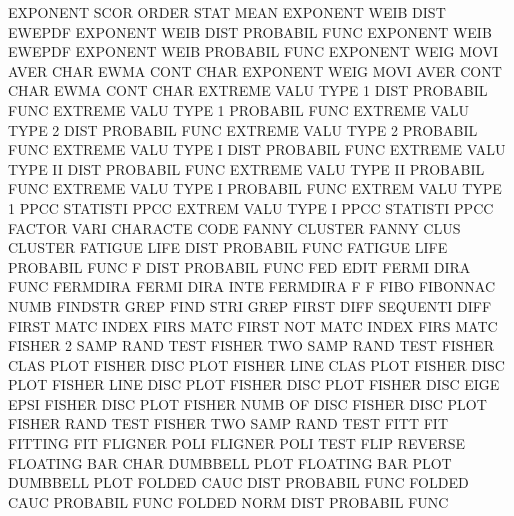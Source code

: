 EXPONENT SCOR                           ORDER    STAT MEAN
EXPONENT WEIB DIST                      EWEPDF
EXPONENT WEIB DIST                      PROBABIL FUNC
EXPONENT WEIB                           EWEPDF
EXPONENT WEIB                           PROBABIL FUNC
EXPONENT WEIG MOVI AVER CHAR            EWMA     CONT CHAR
EXPONENT WEIG MOVI AVER CONT CHAR       EWMA     CONT CHAR
EXTREME  VALU TYPE 1    DIST            PROBABIL FUNC
EXTREME  VALU TYPE 1                    PROBABIL FUNC
EXTREME  VALU TYPE 2    DIST            PROBABIL FUNC
EXTREME  VALU TYPE 2                    PROBABIL FUNC
EXTREME  VALU TYPE I    DIST            PROBABIL FUNC
EXTREME  VALU TYPE II   DIST            PROBABIL FUNC
EXTREME  VALU TYPE II                   PROBABIL FUNC
EXTREME  VALU TYPE I                    PROBABIL FUNC
EXTREM   VALU TYPE 1    PPCC            STATISTI PPCC
EXTREM   VALU TYPE I    PPCC            STATISTI PPCC
FACTOR   VARI                           CHARACTE CODE
FANNY                                   CLUSTER
FANNY    CLUS                           CLUSTER
FATIGUE  LIFE DIST                      PROBABIL FUNC
FATIGUE  LIFE                           PROBABIL FUNC
F        DIST                           PROBABIL FUNC
FED                                     EDIT
FERMI    DIRA FUNC                      FERMDIRA
FERMI    DIRA INTE                      FERMDIRA
F                                       F
FIBO                                    FIBONNAC NUMB
FINDSTR                                 GREP
FIND     STRI                           GREP
FIRST    DIFF                           SEQUENTI DIFF
FIRST    MATC                           INDEX    FIRS MATC
FIRST    NOT  MATC                      INDEX    FIRS MATC
FISHER   2    SAMP RAND TEST            FISHER   TWO  SAMP RAND TEST
FISHER   CLAS PLOT                      FISHER   DISC PLOT
FISHER   LINE CLAS PLOT                 FISHER   DISC PLOT
FISHER   LINE DISC PLOT                 FISHER   DISC PLOT
FISHER   DISC EIGE EPSI                 FISHER   DISC PLOT
FISHER   NUMB OF   DISC                 FISHER   DISC PLOT
FISHER   RAND TEST                      FISHER   TWO  SAMP RAND TEST
FITT                                    FIT
FITTING                                 FIT
FLIGNER  POLI                           FLIGNER  POLI TEST
FLIP                                    REVERSE
FLOATING BAR  CHAR                      DUMBBELL PLOT
FLOATING BAR  PLOT                      DUMBBELL PLOT
FOLDED   CAUC DIST                      PROBABIL FUNC
FOLDED   CAUC                           PROBABIL FUNC
FOLDED   NORM DIST                      PROBABIL FUNC
